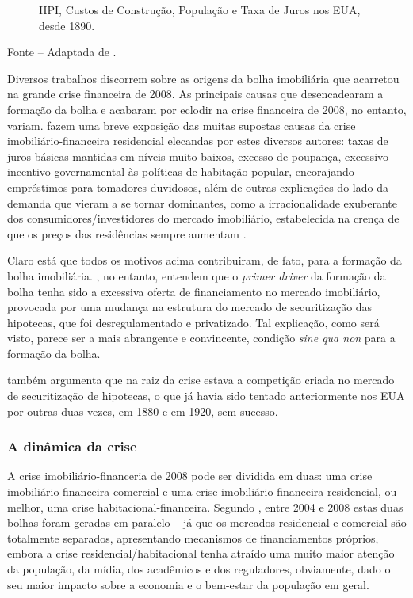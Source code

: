 \documentclass[
	12pt,				%
	oneside,			%
	a4paper,			%
	chapter=TITLE,		%
	section=TITLE,		%
	english,			%
	brazil				%
	]{abntex2}
\newcommand{\bcenter}{\begin{center}}
\newcommand{\ecenter}{\end{center}}
\begin{document}
\begin{refsection}
\begin{figure}[H]
{}

\caption{HPI, Custos de Construção, População e Taxa de Juros nos EUA, desde 1890.}\label{fig:unnamed-chunk-20}
\end{figure}
\bcenter

\small Fonte -- Adaptada de \textcite[p.~13]{shiller}.
\ecenter

Diversos trabalhos discorrem sobre as origens da bolha imobiliária que acarretou
na grande crise financeira de 2008. As principais causas que desencadearam a
formação da bolha e acabaram por eclodir na crise financeira de 2008, no
entanto, variam. \textcite{levitin2012} fazem uma breve exposição das muitas supostas
causas da crise imobiliário-financeira residencial elecandas por estes diversos
autores: taxas de juros básicas mantidas em níveis muito baixos, excesso de
poupança, excessivo incentivo governamental às políticas de habitação popular,
encorajando empréstimos para tomadores duvidosos, além de outras explicações do
lado da demanda que vieram a se tornar dominantes, como a irracionalidade
exuberante dos consumidores/investidores do mercado imobiliário, estabelecida na
crença de que os preços das residências sempre aumentam \autocite{shiller}.

Claro está que todos os motivos acima contribuiram, de fato, para a formação da
bolha imobiliária. \textcite{levitin2012}, no entanto, entendem que o \emph{primer driver} da
formação da bolha tenha sido a excessiva oferta de financiamento no mercado
imobiliário, provocada por uma mudança na estrutura do mercado de securitização
das hipotecas, que foi desregulamentado e privatizado. Tal explicação, como será
visto, parece ser a mais abrangente e convincente, condição \emph{sine qua non} para
a formação da bolha.

\textcite{simkovic} também argumenta que na raiz da crise estava a competição criada no
mercado de securitização de hipotecas, o que já havia sido tentado anteriormente
nos EUA por outras duas vezes, em 1880 e em 1920, sem sucesso.

\hypertarget{a-dinuxe2mica-da-crise}{%
\subsubsection{A dinâmica da crise}\label{a-dinuxe2mica-da-crise}}

A crise imobiliário-financeria de 2008 pode ser dividida em duas: uma crise
imobiliário-financeira comercial e uma crise imobiliário-financeira residencial,
ou melhor, uma crise habitacional-financeira. Segundo \textcite[p.~84]{levitin2013},
entre 2004 e 2008 estas duas bolhas foram geradas em paralelo -- já que os
mercados residencial e comercial são totalmente separados, apresentando
mecanismos de financiamentos próprios, embora a crise residencial/habitacional
tenha atraído uma muito maior atenção da população, da mídia, dos acadêmicos e
dos reguladores, obviamente, dado o seu maior impacto sobre a economia e o
bem-estar da população em geral.
\begin{figure}[H]


\end{figure}
\end{refsection}
\end{document}
